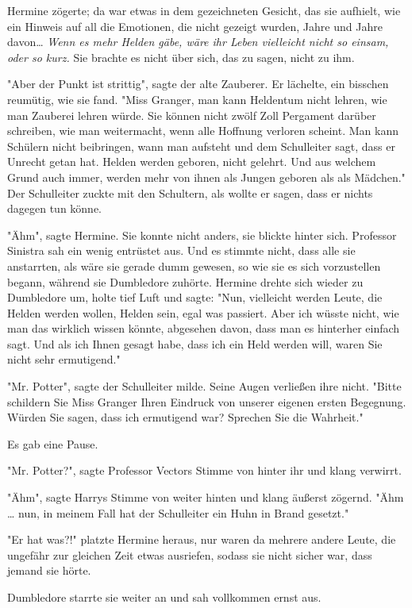 {Hermine zögerte; da war etwas in dem gezeichneten Gesicht, das sie aufhielt, wie ein Hinweis auf all die Emotionen, die nicht gezeigt wurden, Jahre und Jahre davon… \emph{Wenn es mehr Helden gäbe, wäre ihr Leben vielleicht nicht so einsam, oder so kurz.} Sie brachte es nicht über sich, das zu sagen, nicht zu ihm.

"Aber der Punkt ist strittig", sagte der alte Zauberer. Er lächelte, ein bisschen reumütig, wie sie fand. "Miss Granger, man kann Heldentum nicht lehren, wie man Zauberei lehren würde. Sie können nicht zwölf Zoll Pergament darüber schreiben, wie man weitermacht, wenn alle Hoffnung verloren scheint. Man kann Schülern nicht beibringen, wann man aufsteht und dem Schulleiter sagt, dass er Unrecht getan hat. Helden werden geboren, nicht gelehrt. Und aus welchem Grund auch immer, werden mehr von ihnen als Jungen geboren als als Mädchen." Der Schulleiter zuckte mit den Schultern, als wollte er sagen, dass er nichts dagegen tun könne.

"Ähm", sagte Hermine. Sie konnte nicht anders, sie blickte hinter sich. Professor Sinistra sah ein wenig entrüstet aus. Und es stimmte nicht, dass alle sie anstarrten, als wäre sie gerade dumm gewesen, so wie sie es sich vorzustellen begann, während sie Dumbledore zuhörte. Hermine drehte sich wieder zu Dumbledore um, holte tief Luft und sagte: "Nun, vielleicht werden Leute, die Helden werden wollen, Helden sein, egal was passiert. Aber ich wüsste nicht, wie man das wirklich wissen könnte, abgesehen davon, dass man es hinterher einfach sagt. Und als ich Ihnen gesagt habe, dass ich ein Held werden will, waren Sie nicht sehr ermutigend."

"Mr. Potter", sagte der Schulleiter milde. Seine Augen verließen ihre nicht. "Bitte schildern Sie Miss Granger Ihren Eindruck von unserer eigenen ersten Begegnung. Würden Sie sagen, dass ich ermutigend war? Sprechen Sie die Wahrheit."

Es gab eine Pause.

"Mr. Potter?", sagte Professor Vectors Stimme von hinter ihr und klang verwirrt.

"Ähm", sagte Harrys Stimme von weiter hinten und klang äußerst zögernd. "Ähm … nun, in meinem Fall hat der Schulleiter ein Huhn in Brand gesetzt."

"Er hat was?!" platzte Hermine heraus, nur waren da mehrere andere Leute, die ungefähr zur gleichen Zeit etwas ausriefen, sodass sie nicht sicher war, dass jemand sie hörte.

Dumbledore starrte sie weiter an und sah vollkommen ernst aus.

}
